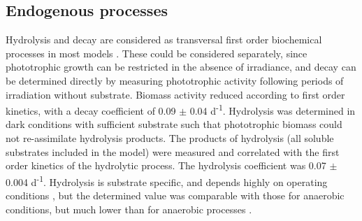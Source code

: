 \subsection{Endogenous processes}
Hydrolysis and decay are considered as transversal first order biochemical processes in most models \cite{batstone2006, henze2000, szilvester2010}. These could be considered separately, since phototrophic growth can be restricted in the absence of irradiance, and decay can be determined directly by measuring phototrophic activity following periods of irradiation without substrate. Biomass activity reduced according to first order kinetics, with a decay coefficient of \num{0.09} $\pm$ \num{0.04} d\textsuperscript{-1}. Hydrolysis was determined in dark conditions with sufficient substrate such that phototrophic biomass could not re-assimilate hydrolysis products. The products of hydrolysis (all soluble substrates included in the model) were measured and correlated with the first order kinetics of the hydrolytic process. The hydrolysis coefficient was \num{0.07} $\pm$ \num{0.004} d\textsuperscript{-1}. Hydrolysis is substrate specific, and depends highly on operating conditions \cite{batstone2015}, but the determined value was comparable with those for anaerobic conditions, but much lower than for anaerobic processes \cite{henze2000}. 

